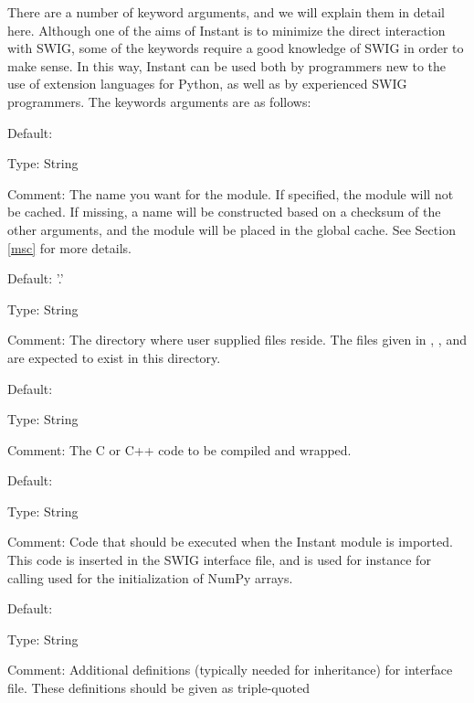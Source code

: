 There are a number of keyword arguments, and we will explain them in detail
here. Although one of the aims of Instant is to minimize the direct
interaction with SWIG, some of the keywords require a good knowledge of SWIG
in order to make sense. In this way, Instant can be used both by programmers
new to the use of extension languages for Python, as well as by experienced
SWIG programmers. The keywords arguments are as follows:
\bit
\item {}
  \bit 
  \item Default: 
  \item Type: String
  \item Comment: The name you want for the module.
    If specified, the module will not be cached.
    If missing, a name will be constructed based on
    a checksum of the other arguments, and the module
    will be placed in the global cache. See Section \ref{msc} for more
    details.
  \eit
\item {}
  \bit
    \item Default: '.'
    \item Type: String
    \item Comment: The directory where user supplied files reside. The files
      given in , , and 
      are expected to exist in this directory.
  \eit
\item {}
  \bit
    \item Default: 
    \item Type: String
    \item Comment: The C or C++ code to be compiled and wrapped.
  \eit
\item {}
  \bit
    \item Default: 
    \item Type: String
    \item Comment: Code that should be executed when the Instant module is
      imported. This code is inserted in the SWIG interface file, and is
      used for instance for calling  used for the
      initialization of NumPy arrays.
  \eit
\item {}
  \bit
    \item Default: 
    \item Type: String
    \item Comment: Additional definitions (typically needed for inheritance)
      for interface file. These definitions should be given as triple-quoted
